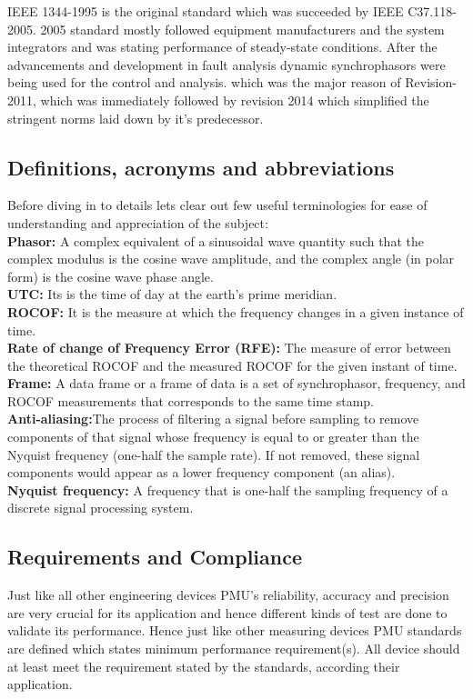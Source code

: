 IEEE 1344-1995 is the original standard which was succeeded by IEEE C37.118-2005. 2005 standard mostly followed equipment manufacturers and the system integrators and was stating performance of steady-state conditions. After the advancements and development in fault analysis dynamic synchrophasors were being used for the control and analysis.  which was the major reason of Revision-2011, which was immediately followed by revision 2014 which simplified the stringent norms laid down by it's predecessor.

\subsection{Definitions, acronyms and abbreviations}

Before diving in to details lets clear out few useful terminologies for ease of understanding and appreciation of the subject:\\
\textbf{Phasor:} A complex equivalent of a sinusoidal wave quantity such that the complex modulus is the cosine wave amplitude, and the complex angle (in polar form) is the cosine wave phase angle.\\
\textbf{UTC:} Its is the time of day at the earth's prime meridian.\\
\textbf{ROCOF:} It is the measure at which the frequency changes in a given instance of time.\\
\textbf{Rate of change of Frequency Error (RFE):} The measure of error between the theoretical ROCOF and the measured ROCOF for the given instant of time.\\
\textbf{Frame:} A data frame or a frame of data is a set of synchrophasor, frequency, and ROCOF measurements that corresponds to the same time stamp.\\
\textbf{Anti-aliasing:}The process of filtering a signal before sampling to remove components of that signal whose frequency is equal to or greater than the Nyquist frequency (one-half the sample rate). If not removed, these signal components would appear as a lower frequency component (an alias).\\
\textbf{Nyquist frequency:} A frequency that is one-half the sampling frequency of a discrete signal processing
system.\\

\subsection{Requirements and Compliance}
Just like all other engineering devices PMU's reliability, accuracy  and precision are very crucial for its application and hence different kinds of test are done to validate its performance. Hence just like other measuring devices PMU standards are defined which states minimum performance requirement(s). All device should at least meet the requirement stated by the standards, according their application.


